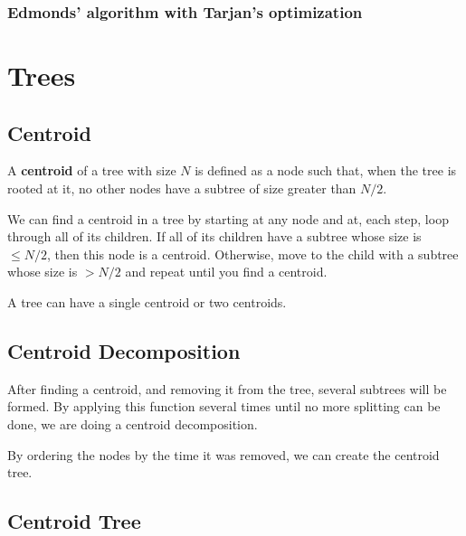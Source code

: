 	\subsubsection{Edmonds' algorithm with Tarjan's optimization}


\newpage

\section{Trees}


\subsection{Centroid}

A \textbf{centroid} of a tree with size $N$ is defined as a node such that, when the tree is rooted
at it, no other nodes have a subtree of size greater than $N/2$.

We can find a centroid in a tree by starting at any node and at, each step, 
loop through all of its children. 
If all of its children have a subtree whose size is $ \leq N/2$, then this node is a centroid. 
Otherwise, move to the child with a subtree whose size is $> N/2$ 
and repeat until you find a centroid.

A tree can have a single centroid or two centroids.


\vspace{5pt}

\subsection{Centroid Decomposition}

After finding a centroid, and removing it from the tree, several subtrees will be formed.
By applying this function several times until no more splitting can be done,
we are doing a centroid decomposition. 

By ordering the nodes by the time it was removed, we can create the centroid tree.

\subsection{Centroid Tree}

\vspace{5pt}

